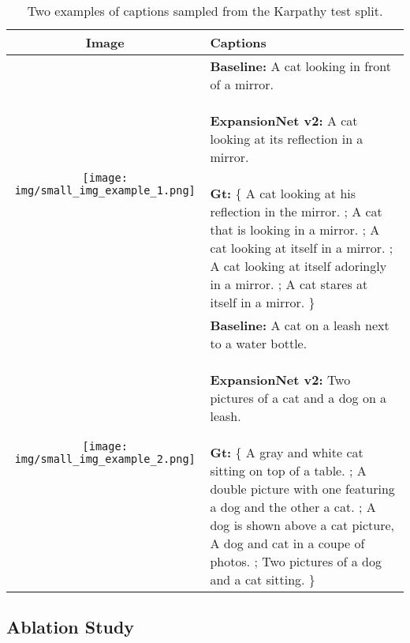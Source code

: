 \begin{table}[ht!]
 \centering
 \scriptsize
 \caption{Two examples of captions sampled from the Karpathy test split.}
 \begin{tabular}{ @{}c@{} | >{\RaggedRight\arraybackslash}p{4.5cm} }
 Image & Captions \\
 \hline
 \texttt{[image: img/small\_img\_example\_1.png]}
& \vspace{-2.0cm}{\textbf{Baseline:} A cat looking in front of a mirror. \leavevmode\newline \leavevmode\newline
\textbf{ExpansionNet v2:} A cat looking at its reflection in a mirror.
\leavevmode\newline \leavevmode\newline
\textbf{Gt:} \{ A cat looking at his reflection in the mirror. ; A cat that is looking in a mirror. ; A cat looking at itself in a mirror. ;  A cat looking at itself adoringly in a mirror. ;
A cat stares at itself in a mirror. \} } \\
\hline
 \texttt{[image: img/small\_img\_example\_2.png]}
& \vspace{-2.0cm}{\textbf{Baseline:} A cat on a leash next to a water bottle. \leavevmode\newline \leavevmode\newline
\textbf{ExpansionNet v2:} Two pictures of a cat and a dog on a leash.
\leavevmode\newline \leavevmode\newline
\textbf{Gt:} \{ A gray and white cat sitting on top of a table. ; A double picture with one featuring a dog and the other a cat. ; A dog is shown above a cat picture,  A dog and cat in a coupe of photos. ; 
Two pictures of a dog and a cat sitting. \} } \\
\hline
\end{tabular}
\label{small_table_img}
\end{table}


\subsection{Ablation Study}
\label{section_ablation}

